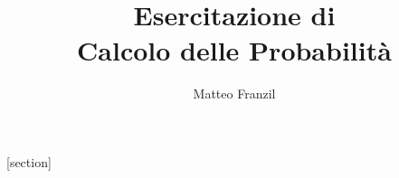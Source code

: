 
\usepackage[utf8]{inputenc}
\usepackage{graphicx}
\usepackage{ifthen}
\usepackage{xcolor}
\usepackage{listings}
\usepackage{makecell}
\usepackage{tikz}
\usepackage{url}
\usepackage{mathtools}
\usepackage{ulem}
\usepackage{mathcomp}
\usepackage[italian]{babel}
\usepackage{amsmath,amsthm,amssymb,amsfonts}
\usepackage{setspace}
\usepackage{tikz}
\usepackage{soul}

\usepackage{../tikzit}






[section]


\newtheorem{exercise}{Esercizio}

\addto{}
\renewcommand*{\proofname}{Solution}
\renewcommand\qedsymbol{$\blacksquare$}

\newcommand{\mean}[1]{$\mathbb{E}[#1]$}
\newcommand{\varr}[1]{$\mathbb{V}ar[#1]$}

\setlength{\jot}{15pt}

\newcommand{\roundpic}[4][]{
	\tikz\node [circle, minimum width = #2,
		path picture = {
				\node [#1] at (path picture bounding box.center) {
					\texttt{[image: \#4]}};
			}] {};}

\title[Calcolo delle Probabilità]
{Esercitazione di\\Calcolo delle Probabilità}

\author[DISI]{%
	\texorpdfstring{Matteo Franzil}{DISI}
}

